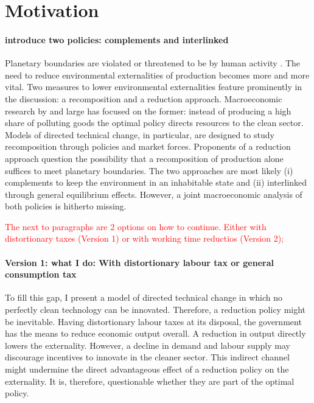 \documentclass[12pt]{article}
\newcommand{\tr}[1]{\textcolor{red}{#1}}
\begin{document}
\section{Motivation}

\paragraph{introduce two policies: complements and interlinked}
Planetary boundaries are violated or threatened to be by human activity \citep{Rockstrom2009AHumanity}. The need to reduce environmental externalities of production becomes more and more vital.  %
Two measures to lower environmental externalities feature prominently in the discussion: a recomposition and a reduction approach. Macroeconomic research by and large has focused on the former: instead of producing a high share of polluting goods the optimal policy directs resources to the clean sector. Models of directed technical change, in particular, are designed to study recomposition through policies and market forces.
Proponents of a reduction approach question the possibility that a recomposition of production alone suffices to meet planetary boundaries. The two approaches are most likely (i) complements to keep the environment in an inhabitable state and (ii) interlinked through general equilibrium effects. However,
a joint macroeconomic analysis of both policies is hitherto missing. 

\tr{The next to paragraphs are 2 options on how to continue. Either with distortionary taxes (Version 1) or with working time reductios (Version 2); }
\paragraph{Version 1: what I do: With distortionary labour tax or general consumption tax}
To fill this gap, I present a model of directed technical change in which no perfectly clean technology can be innovated. Therefore, a reduction policy might be inevitable. Having distortionary labour taxes at its disposal, the government has the means to reduce economic output overall. A reduction in output directly lowers the externality. However, a decline in demand and labour supply may discourage incentives to innovate in the cleaner sector. This indirect channel might undermine the direct advantageous effect of a reduction policy on the externality. It is, therefore, questionable whether they are part of the optimal policy.
\end{document}
